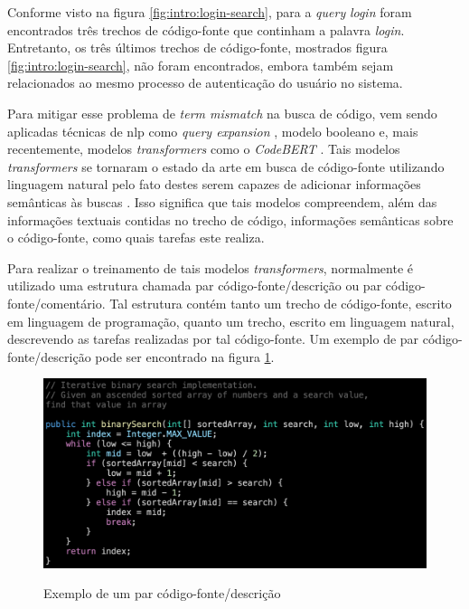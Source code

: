 Conforme visto na figura \ref{fig:intro:login-search}, para a \textit{query} \textit{login} foram encontrados três trechos de código-fonte que continham a palavra \textit{login}. Entretanto, os três últimos trechos de código-fonte, mostrados figura \ref{fig:intro:login-search}, não foram encontrados, embora também sejam relacionados ao mesmo processo de autenticação do usuário no sistema.

Para mitigar esse problema de \textit{term mismatch} na busca de código, vem sendo aplicadas técnicas de \gls{nlp} como \textit{query expansion} \cite{Nie2016QueryEB}, modelo booleano \cite{lv2015codehow} e, mais recentemente, modelos \textit{transformers} como o \textit{CodeBERT} \cite{Feng2020CodeBERTAP}. Tais modelos \textit{transformers} se tornaram o estado da arte em busca de código-fonte utilizando linguagem natural pelo fato destes serem capazes de adicionar informações semânticas às buscas \cite{Guo2021GraphCodeBERTPC}. Isso significa que tais modelos compreendem, além das informações textuais contidas no trecho de código, informações semânticas sobre o código-fonte, como quais tarefas este realiza.

Para realizar o treinamento de tais modelos \textit{transformers}, normalmente é utilizado uma estrutura chamada par código-fonte/descrição ou par código-fonte/comentário. Tal estrutura contém tanto um trecho de código-fonte, escrito em linguagem de programação, quanto um trecho, escrito em linguagem natural, descrevendo as tarefas realizadas por tal código-fonte. Um exemplo de par código-fonte/descrição pode ser encontrado na figura \ref{fig:intro:code-description-pair}.

\begin{figure}[H]
  \centering
  \caption{Exemplo de um par código-fonte/descrição}
  \includegraphics[width=\textwidth,keepaspectratio=true]{resources/images/introducao/code-desc-pair.png}
  \label{fig:intro:code-description-pair}
\end{figure}

